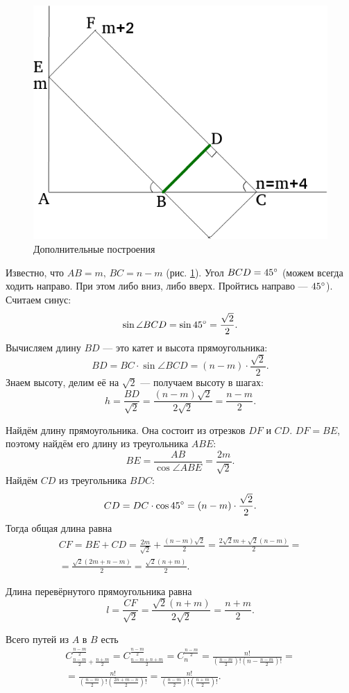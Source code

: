 \begin{enumerate}[label=\alph*)]
\begin{figure}[h!]
  \centering
  \includegraphics[width=.6\textwidth]{./pictures/4_22_8.png}
  \caption{Дополнительные построения}
  \label{fig:4228}
\end{figure}

Известно, что $AB = m, \, BC = n - m$ (рис. \ref{fig:4228}).
Угол $BCD = 45 \degree$ (можем всегда ходить направо.
При этом либо вниз, либо вверх.
Пройтись направо --- $45 \degree$).
Считаем синус:
$$ \sin \angle BCD =
\sin 45 \degree =
\frac{ \sqrt{2} }{2}.$$
Вычисляем длину $BD$ --- это катет и высота прямоугольника:
$$BD =
BC \cdot \sin \angle BCD =
\left( n-m \right) \cdot \frac{ \sqrt{2} }{2}.$$
Знаем высоту, делим её на $ \sqrt{2} $ --- получаем высоту в шагах:
$$h =
\frac{BD}{ \sqrt{2} } =
\frac{ \left( n-m \right) \sqrt{2} }{2 \sqrt{2} } =
\frac{n-m}{2}.$$

Найдём длину прямоугольника. Она состоит из отрезков $DF$ и $CD$.
$DF = BE$, поэтому найдём его длину из треугольника $ABE$:
$$BE =
\frac{AB}{ \cos \angle ABE} =
\frac{2m}{ \sqrt{2} }.$$
Найдём $CD$ из треугольника $BDC$:
$$CD =
DC \cdot \cos 45 \degree =
\left( n-m \right) \cdot \frac{ \sqrt{2} }{2}.$$
Тогда общая длина равна
\begin{equation*}
\begin{split}
CF =
BE + CD =
\frac{2m}{ \sqrt{2} } + \frac{ \left( n-m \right) \sqrt{2} }{2} =
\frac{2 \sqrt{2} m + \sqrt{2} \left( n-m \right) }{2} = \\
= \frac{ \sqrt{2} \left( 2m+n-m \right) }{2} =
\frac{ \sqrt{2} \left( n+m \right) }{2}.
\end{split}
\end{equation*}

Длина перевёрнутого прямоугольника равна
$$l =
\frac{CF}{ \sqrt{2} } =
\frac{ \sqrt{2} \left( n+m \right) }{2 \sqrt{2} } =
\frac{n+m}{2}.$$

Всего путей из $A$ в $B$ есть
\begin{equation*}
\begin{split}
C_{ \frac{n-m}{2} + \frac{n+m}{2} }^{ \frac{n-m}{2} } =
C_{ \frac{n-m+n+m}{2} }^{ \frac{n-m}{2} } =
C_n^{ \frac{n-m}{2} } =
\frac{n!}{ \left( \frac{n-m}{2} \right)! \left( n - \frac{n-m}{2} \right)! } = \\
= \frac{n!}{ \left( \frac{n-m}{2} \right)! \left( \frac{2n+m-n}{2} \right)!} =
\frac{n!}{ \left( \frac{n-m}{2} \right)! \left( \frac{n+m}{2} \right)!}. 
\end{split}
\end{equation*}


\end{enumerate}
